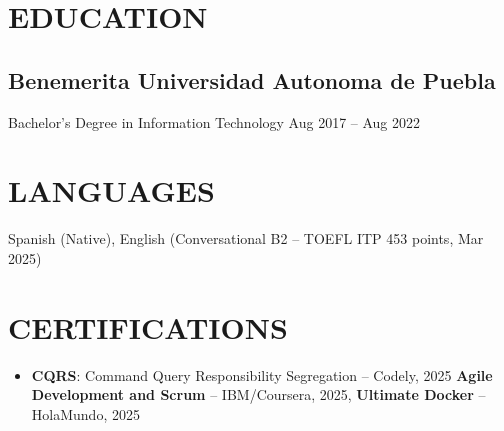 \documentclass[a4paper,10pt]{article}
\newcommand{\kw}[1]{\textbf{\textcolor{keyword}{#1}}}
\newcommand{\tech}[1]{\textbf{\textcolor{tech}{#1}}}
\begin{document}
\section*{EDUCATION}

\subsection*{Benemerita Universidad Autonoma de Puebla}
Bachelor's Degree in Information Technology \hfill Aug 2017 -- Aug 2022

\section*{LANGUAGES}
Spanish (Native), English (Conversational B2 -- TOEFL ITP 453 points, Mar 2025)

\section*{CERTIFICATIONS}
\begin{itemize}[noitemsep, leftmargin=*]
    \item \kw{CQRS}: Command Query Responsibility Segregation -- Codely, 2025 
    \kw{Agile Development and Scrum} -- IBM/Coursera, 2025, 
    \tech{Ultimate Docker} -- HolaMundo, 2025
\end{itemize}
\end{document}
